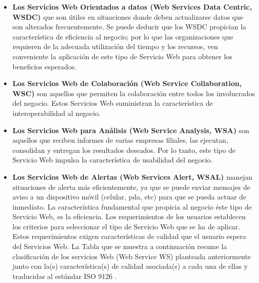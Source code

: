 \documentclass[12pt,letterpaper,titlepage]{article}
\begin{document}
\begin{itemize}\itemsep=0pt
\item \textbf{Los Servicios Web Orientados a datos (Web Services Data Centric, WSDC)} que son útiles en situaciones donde deben actualizarse datos que son alterados frecuentemente. Se puede deducir que los WSDC propician la característica de eficiencia al negocio; por lo que las organizaciones que requieren de la adecuada utilización del tiempo y los recursos, ven conveniente la aplicación de este tipo de Servicio Web para obtener los beneficios esperados.\\
\item \textbf{Los Servicios Web de Colaboración (Web Service Collaboration, WSC)} son aquellos que permiten la colaboración entre todos los involucrados del negocio. Estos Servicios Web suministran la característica de interoperabilidad al negocio.\\
\item \textbf{Los Servicios Web para Análisis (Web Service Analysis, WSA)} son aquellos que reciben informes de varias empresas filiales, las ejecutan, consolidan y entregan los resultados deseados. Por lo tanto, este tipo de Servicio Web impulsa la característica de usabilidad del negocio.\\
\item \textbf{Los Servicios Web de Alertas (Web Services Alert, WSAL)} manejan situaciones de alerta más eficientemente, ya que se puede enviar mensajes de aviso a un dispositivo móvil (celular, pda, etc) para que se pueda actuar de inmediato. La característica fundamental que propicia al negocio éste tipo de Servicio Web, es la eficiencia. Los requerimientos de los usuarios establecen los criterios para seleccionar el tipo de Servicio Web que se ha de aplicar. Estos requerimientos exigen características de calidad que el usuario espera del Servicios Web. La Tabla que se muestra a continuación resume la clasificación de los servicios Web (Web Service WS) planteada anteriormente junto con la(s) característica(s) de calidad asociada(s) a cada una de ellas y traducidas al estándar ISO 9126 \cite{123}.
\end{itemize}
\end{document}
